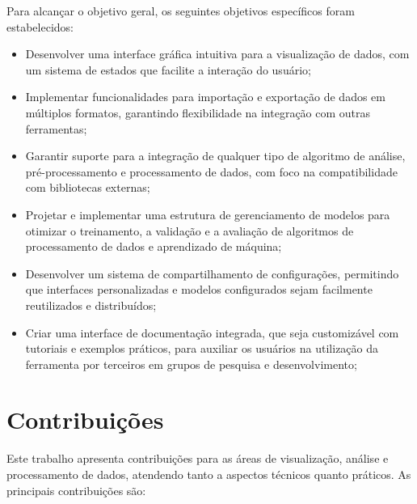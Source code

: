 Para alcançar o objetivo geral, os seguintes objetivos específicos foram estabelecidos:

\begin{itemize}
    \item Desenvolver uma interface gráfica intuitiva para a visualização de dados, com um sistema de estados que facilite a interação do usuário;
    \item Implementar funcionalidades para importação e exportação de dados em múltiplos formatos, garantindo flexibilidade na integração com outras ferramentas;
    \item Garantir suporte para a integração de qualquer tipo de algoritmo de análise, pré-processamento e processamento de dados, com foco na compatibilidade com bibliotecas externas;
    \item Projetar e implementar uma estrutura de gerenciamento de modelos para otimizar o treinamento, a validação e a avaliação de algoritmos de processamento de dados e aprendizado de máquina;
    \item Desenvolver um sistema de compartilhamento de configurações, permitindo que interfaces personalizadas e modelos configurados sejam facilmente reutilizados e distribuídos;
    \item Criar uma interface de documentação integrada, que seja customizável com tutoriais e exemplos práticos, para auxiliar os usuários na utilização da ferramenta por terceiros em grupos de pesquisa e desenvolvimento;
\end{itemize}

\section{Contribuições}
\label{sec:1:contribuicoes}

Este trabalho apresenta contribuições para as áreas de visualização, análise e processamento de dados, atendendo tanto a aspectos técnicos quanto práticos. As principais contribuições são:

